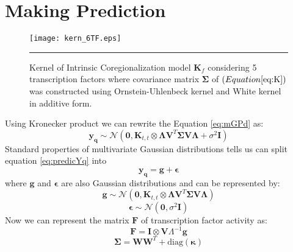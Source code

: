 \section{Making Prediction}
\begin{figure}[t]
	\centering
		\texttt{[image: kern\_6TF.eps]}
		\rule{35em}{0.5pt}
	\caption[Kernel of intrinsic coregionalization model $\textbf{K}_f$ considering 5 transcription factors where covariance matrix $\boldsymbol{\Sigma}$ was constructed using Ornstein-Uhlenbeck kernel and White kernel in additive form] {Kernel of Intrinsic Coregionalization model $\textbf{K}_f$ considering 5 transcription factors where covariance matrix $\boldsymbol{\Sigma}$ of $\left( Equation \ref{eq:K} \right)$ was constructed using Ornstein-Uhlenbeck kernel and White kernel in additive form.}
	\label{fig:kern_6TF}
\end{figure}
Using Kronecker product we can rewrite the Equation \ref{eq:mGPd} as:
\begin{equation} \label{eq:predicYq}
  \mathbf{y_q}  \sim \mathcal{N} \left( \mathbf{0}, 
    \mathbf{K}_{t,t} \otimes \boldsymbol{\Lambda} \mathbf{V}^T\boldsymbol{\Sigma} \mathbf{V} \boldsymbol{\Lambda} +
    \sigma^2\mathbf{I}\right)
\end{equation}
Standard properties of multivariate Gaussian distributions tells us can split equation \ref{eq:predicYq} into
\begin{equation} \label{eq:gEp}
  \mathbf{y_q} = \mathbf{g} + \boldsymbol{\epsilon}
\end{equation}
where $\mathbf{g}$ and $\boldsymbol{\epsilon}$ are also Gaussian distributions and can be represented by:
\begin{equation}\label{eq:g}
  \mathbf{g} \sim \mathcal{N} \left( \mathbf{0}, 
    \mathbf{K}_{t,t} \otimes 
    \boldsymbol{\Lambda} \mathbf{V}^T\boldsymbol{\Sigma} \mathbf{V} \boldsymbol{\Lambda} \right)
\end{equation}
\begin{equation}\label{eq:Epsi}
  \boldsymbol{\epsilon} \sim \mathcal{N} \left(\mathbf{0},\sigma^2\mathbf{I}\right)
\end{equation}
Now we can represent the matrix $\mathbf{F}$ of transcription factor activity as:
\begin{equation}\label{eq:F}
  \mathbf{F} = \mathbf{I} \otimes \mathbf{V} \Lambda^{-1} \mathbf{g}
\end{equation}
\begin{equation}\label{eq:Sigma}
  \boldsymbol{\Sigma} = \mathbf{W}\mathbf{W}^T + \text{diag}\left(\boldsymbol{\kappa}\right)
\end{equation}
